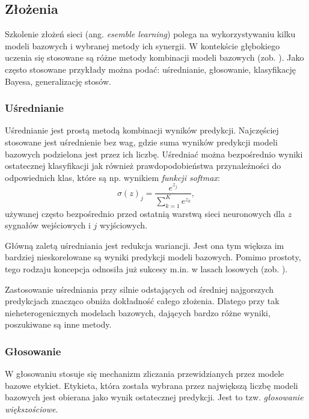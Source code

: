 \subsection{Złożenia}
Szkolenie złożeń sieci (ang. \textit{esemble learning}) polega na wykorzystywaniu kilku modeli bazowych i wybranej metody ich synergii. W kontekście głębokiego uczenia się stosowane są różne metody kombinacji modeli bazowych (zob. \cite{Ensemble}). Jako często stosowane przykłady można podać: uśrednianie, głosowanie, klasyfikację Bayesa, generalizację stosów.

\subsubsection{Uśrednianie}
Uśrednianie jest prostą metodą kombinacji wyników predykcji. Najczęściej stosowane jest uśrednienie bez wag, gdzie suma wyników predykcji modeli bazowych podzielona jest przez ich liczbę. Uśredniać można bezpośrednio wyniki ostatecznej klasyfikacji jak również prawdopodobieństwa przynależności do odpowiednich klas, które są np. wynikiem \textit{funkcji softmax}:
\begin{equation}
\sigma (z)_j= \frac{e^{z_j}}{\sum_{k=1}^{K} e^{z_k}},
\end{equation} 
używanej często bezpośrednio przed ostatnią warstwą sieci neuronowych dla $z$ sygnałów wejściowych i $j$ wyjściowych.

Główną zaletą uśredniania jest redukcja wariancji. Jest ona tym większa \linebreak im bardziej nieskorelowane są wyniki predykcji modeli bazowych. Pomimo prostoty, tego rodzaju koncepcja odnosiła już sukcesy m.in. w lasach losowych (zob. \cite{Breiman2001}).

Zastosowanie uśredniania przy silnie odstających od średniej najgorszych predykcjach znacząco obniża dokładność całego złożenia. Dlatego przy tak nieheterogenicznych modelach bazowych, dających bardzo różne wyniki, poszukiwane są inne metody.

\subsubsection{Głosowanie}

W głosowaniu stosuje się mechanizm zliczania przewidzianych przez modele bazowe etykiet. Etykieta, która została wybrana przez największą liczbę modeli bazowych jest obierana jako wynik ostatecznej predykcji. Jest to tzw. \textit{głosowanie większościowe}.


